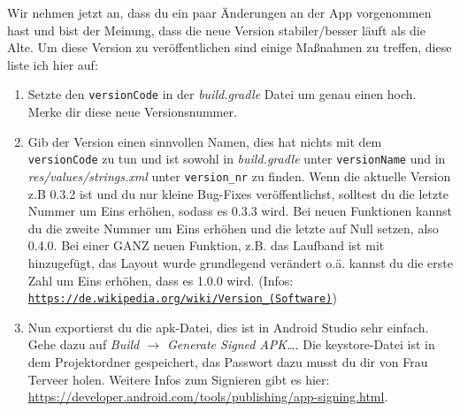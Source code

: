 \documentclass[12pt,headsepline]{scrartcl}
\begin{document}
Wir nehmen jetzt an, dass du ein paar Änderungen an der App vorgenommen hast und bist der Meinung, dass die neue Version stabiler/besser läuft als die Alte.
Um diese Version zu veröffentlichen sind einige Maßnahmen zu treffen, diese liste ich hier auf:
\begin{enumerate}
 \item Setzte den \texttt{versionCode} in der \textit{build.gradle} Datei um genau einen hoch. Merke dir diese neue Versionsnummer.
 \item Gib der Version einen sinnvollen Namen, dies hat nichts mit dem \texttt{versionCode} zu tun und ist sowohl in \textit{build.gradle} unter \texttt{versionName} und in \textit{res/values/strings.xml} unter \texttt{version\_nr} zu finden. Wenn die aktuelle Version z.B 0.3.2 ist und du nur kleine Bug-Fixes veröffentlichst, solltest du die letzte Nummer um Eins erhöhen, sodass es 0.3.3 wird. Bei neuen Funktionen kannst du die zweite Nummer um Eins erhöhen und die letzte auf Null setzen, also 0.4.0. Bei einer GANZ neuen Funktion, z.B. das Laufband ist mit hinzugefügt, das Layout wurde grundlegend verändert o.ä. kannst du die erste Zahl um Eins erhöhen, dass es 1.0.0 wird. (Infos: \href{https://de.wikipedia.org/wiki/Version_\%28Software\%29}{\texttt{https://de.wikipedia.org/wiki/Version\_(Software)}})
 \item Nun exportierst du die apk-Datei, dies ist in Android Studio sehr einfach. Gehe dazu auf \textit{Build $\rightarrow$ Generate Signed APK\dots}. Die keystore-Datei ist in dem Projektordner gespeichert, das Passwort dazu musst du dir von Frau Terveer holen. Weitere Infos zum Signieren gibt es hier: \url{https://developer.android.com/tools/publishing/app-signing.html}.
 

\end{enumerate}
\end{document}
